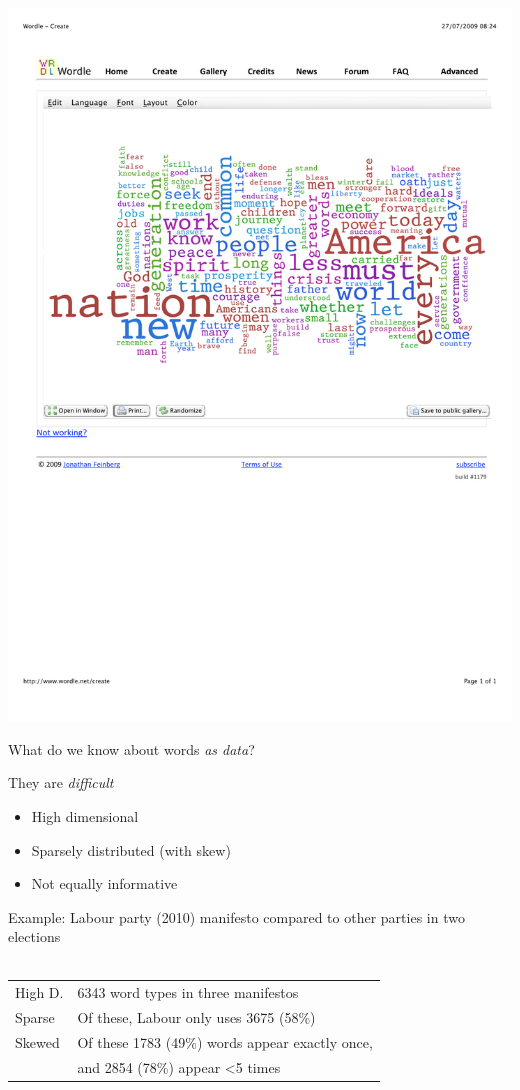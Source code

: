 \documentclass[11pt,compress,professionalfonts]{beamer}
\newcommand{\ita}{\begin{itemize}}
\newcommand{\itm}{\item[]}
\newcommand{\itz}{\end{itemize}}
\begin{document}
\begin{center}
\includegraphics[scale=1.2]{pictures/obamawordle}
\end{center}



What do we know about words \textit{as data}? 

They are \textit{difficult}
\ita
\itm High dimensional 
\itm Sparsely distributed (with skew)
\itm Not equally informative
\itz



Example: Labour party (2010) manifesto compared to other parties in two elections\\
~\\
\begin{tabular}{ll}
High D. & 6343 word types in three manifestos \\
Sparse & Of these, Labour only uses 3675 (58\%)\\ 
Skewed &  Of these 1783 (49\%) words appear exactly once,\\
       &  and 2854 (78\%) appear <5 times
\end{tabular}
\end{document}
